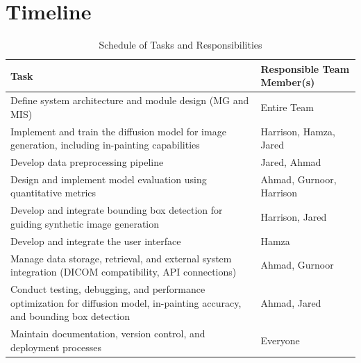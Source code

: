 \documentclass[12pt, titlepage]{article}
\begin{document}
\section{Timeline}
\begin{table}[h]
  \caption{Schedule of Tasks and Responsibilities}
  \label{tab:tasks}
  \centering
  \begin{tabularx}{\textwidth}{|X|X|}
    \hline
    \textbf{Task} & \textbf{Responsible Team Member(s)} \\ 
    \hline
    Define system architecture and module design (MG and MIS) & Entire Team \\ 
    \hline
    Implement and train the diffusion model for image generation, including in-painting capabilities & Harrison, Hamza, Jared \\ 
    \hline
    Develop data preprocessing pipeline & Jared, Ahmad \\ 
    \hline
    Design and implement model evaluation using quantitative metrics & Ahmad, Gurnoor, Harrison \\ 
    \hline
    Develop and integrate bounding box detection for guiding synthetic image generation & Harrison, Jared \\ 
    \hline
    Develop and integrate the user interface & Hamza \\ 
    \hline
    Manage data storage, retrieval, and external system integration (DICOM compatibility, API connections) & Ahmad, Gurnoor \\ 
    \hline
    Conduct testing, debugging, and performance optimization for diffusion model, in-painting accuracy, and bounding box detection & Ahmad, Jared \\ 
    \hline
    Maintain documentation, version control, and deployment processes & Everyone \\ 
    \hline
  \end{tabularx}
\end{table}



\newpage{}
\end{document}
